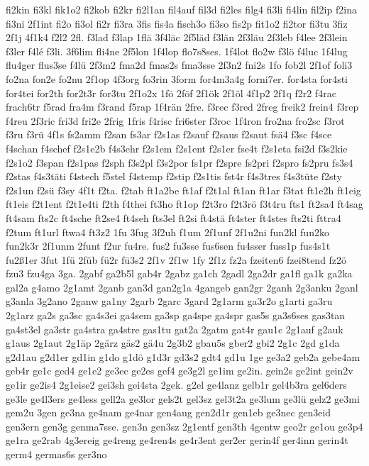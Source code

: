 {fi2kin
fi3kl
fik1o2
fi2kob
fi2kr
fi2l1an
fil4auf
fil3d
fi2les
filg4
fi3li
fi4lin
fil2ip
f2ina
fi3ni
2f1int
fi2o
fi3ol
fi2r
fi3ra
3fis
fis4a
fisch3o
fi3so
fis2p
fit1o2
fi2tor
fi3tu
3fiz
2f1j
4f1k4
f2l2
2fl.
f3lad
f3lap
1flä
3f4läc
2f5läd
f3län
2f3läu
2f3leb
f4lee
2f3lein
f3ler
f4lé
f3li.
3f6lim
fli4ne
2f5lon
1f4lop
flo7s8ses.
1f4lot
flo2w
f3lö
f4luc
1f4lug
flu4ger
flus3se
f4lü
2f3m2
fma2d
fmas2s
fma3sse
2f3n2
fni2s
1fo
fob2l
2f1of
foli3
fo2na
fon2e
fo2nu
2f1op
4f3org
fo3rin
3form
for4m3a4g
forni7er.
for4sta
for4sti
for4tei
for2th
for2t3r
for3tu
2f1o2x
1fö
2föf
2f1ök
2f1öl
4f1p2
2f1q
f2r2
f4rac
frach6tr
f5rad
fra4m
f3rand
f5rap
1f4rän
2fre.
f3rec
f3red
2freg
freik2
frein4
f3rep
f4reu
2f3ric
fri3d
fri2e
2frig
1fris
f4risc
fri6ster
f3roc
1f4ron
fro2na
fro2sc
f3rot
f3ru
f3rü
4f1s
fs2amm
f2san
fs3ar
f2s1as
f2sauf
f2saus
f2saut
fsä4
f3sc
f4sce
f4schan
f4schef
f2s1e2b
f4s3ehr
f2s1em
f2s1ent
f2s1er
fse4t
f2s1eta
fsi2d
f3s2kie
f2s1o2
f3span
f2s1pas
f2sph
f3s2pl
f3s2por
fs1pr
f2spre
fs2pri
f2spro
fs2pru
fs3s4
f2stas
f4s3täti
f4stech
f5stel
f4stemp
f2stip
f2s1tis
fst4r
f4s3tres
f4s3tüte
f2sty
f2s1un
f2sü
f3sy
4f1t
f2ta.
f2tab
ft1a2be
ft1af
f2t1al
ft1an
ft1ar
f3tat
ft1e2h
ft1eig
ft1eis
f2t1ent
f2t1e4ti
f2th
f4thei
ft3ho
ft1op
f2t3ro
f2t3rö
f3t4ru
fts1
ft2sa4
ft4sag
ft4sam
fts2c
ft4sche
ft2se4
ft4seh
fts3el
ft2si
ft4stä
ft4ster
ft4stes
fts2ti
fttra4
f2tum
ft1url
ftwa4
ft3z2
1fu
3fug
3f2uh
f1um
2f1unf
2f1u2ni
fun2kl
fun2ko
fun2k3r
2f1unm
2funt
f2ur
fu4re.
fus2
fu3sse
fus6sen
fu4sser
fuss1p
fus4s1t
fu2ß1er
3fut
1fü
2füb
fü2r
fü3s2
2f1v
2f1w
1fy
2f1z
fz2a
fzeiten6
fzei8tend
fz2ö
fzu3
fzu4ga
3ga.
2gabf
ga2b5l
gab4r
2gabz
ga1ch
2gadl
2ga2dr
ga1fl
ga1k
ga2ka
gal2a
g4amo
2g1amt
2ganb
gan3d
gan2g1a
4gangeb
gan2gr
2ganh
2g3anku
2ganl
g3anla
3g2ano
2ganw
ga1ny
2garb
2garc
3gard
2g1arm
ga3r2o
g1arti
ga3ru
2g1arz
ga2s
ga3sc
ga4s3ei
ga4sem
ga3sp
ga4spe
ga4spr
gas5s
ga3s6ses
gas3tan
ga4st3el
ga3str
ga4stra
ga4stre
gas1tu
gat2a
2gatm
gat4r
gau1c
2g1auf
g2auk
g1aus
2g1aut
2g1äp
2gärz
gäs2
gä4u
2g3b2
gbau5s
gber2
gbi2
2g1c
2gd
g1da
g2d1au
g2d1er
gd1in
g1do
g1dö
g1d3r
gd3s2
gdt4
gd1u
1ge
ge3a2
geb2a
gebe4am
geb4r
ge1c
ged4
ge1e2
ge3ec
ge2es
gef4
ge3g2l
ge1im
ge2in.
gein2s
ge2int
gein2v
ge1ir
ge2is4
2g1eise2
gei3sh
gei4sta
2gek.
g2el
ge4lanz
gelb1r
gel4b3ra
gel6ders
ge3le
ge4l3ers
ge4less
gell2a
ge3lor
gels2t
gel3sz
gel3t2a
ge3lum
ge3lü
gelz2
ge3mi
gem2u
3gen
ge3na
ge4nam
ge4nar
gen4aug
gen2d1r
gen1eb
ge3nec
gen3eid
gen3ern
gen3g
genma7sse.
gen3n
gen3sz
2g1entf
gen3th
4gentw
geo2r
ge1ou
ge3p4
ge1ra
ge2rab
4g3ereig
ge4reng
ge4ren4s
ge4r3ent
ger2er
gerin4f
ger4inn
gerin4t
germ4
germas6s
ger3no
}
